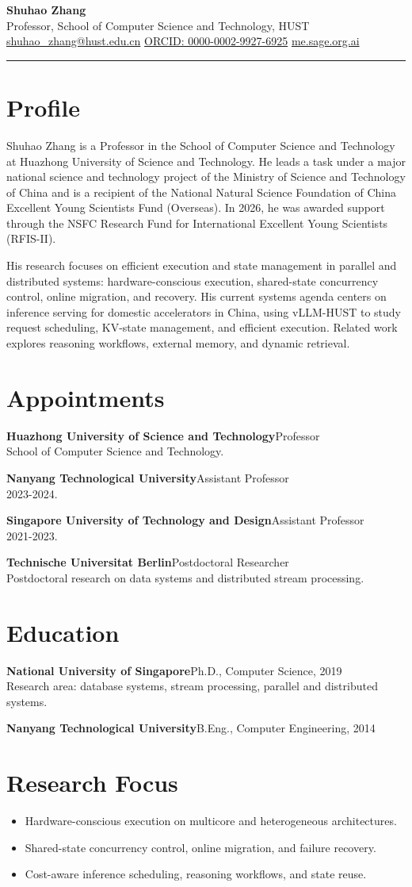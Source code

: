\documentclass[10pt,a4paper]{article}
\newcommand{\cvsection}[1]{\section*{#1}}
\newcommand{\entry}[2]{\textbf{#1}\hfill{\color{muted}#2}\\}
\begin{document}
{\Huge\bfseries Shuhao Zhang}\\[0.25em]
Professor, School of Computer Science and Technology, HUST\\
\href{mailto:shuhao_zhang@hust.edu.cn}{shuhao\_zhang@hust.edu.cn}
\quad
\href{https://orcid.org/0000-0002-9927-6925}{ORCID: 0000-0002-9927-6925}
\quad
\href{https://me.sage.org.ai}{me.sage.org.ai}

\vspace{0.45em}
{\color{accent}\rule{\linewidth}{0.9pt}}

\cvsection{Profile}
Shuhao Zhang is a Professor in the School of Computer Science and Technology at Huazhong University of Science and Technology. He leads a task under a major national science and technology project of the Ministry of Science and Technology of China and is a recipient of the National Natural Science Foundation of China Excellent Young Scientists Fund (Overseas). In 2026, he was awarded support through the NSFC Research Fund for International Excellent Young Scientists (RFIS-II).

His research focuses on efficient execution and state management in parallel and distributed systems: hardware-conscious execution, shared-state concurrency control, online migration, and recovery. His current systems agenda centers on inference serving for domestic accelerators in China, using vLLM-HUST to study request scheduling, KV-state management, and efficient execution. Related work explores reasoning workflows, external memory, and dynamic retrieval.

\cvsection{Appointments}
\entry{Huazhong University of Science and Technology}{Professor}
School of Computer Science and Technology.

\entry{Nanyang Technological University}{Assistant Professor}
2023-2024.

\entry{Singapore University of Technology and Design}{Assistant Professor}
2021-2023.

\entry{Technische Universitat Berlin}{Postdoctoral Researcher}
Postdoctoral research on data systems and distributed stream processing.

\cvsection{Education}
\entry{National University of Singapore}{Ph.D., Computer Science, 2019}
Research area: database systems, stream processing, parallel and distributed systems.

\entry{Nanyang Technological University}{B.Eng., Computer Engineering, 2014}

\cvsection{Research Focus}
\begin{itemize}
  \item Hardware-conscious execution on multicore and heterogeneous architectures.
  \item Shared-state concurrency control, online migration, and failure recovery.
  \item Cost-aware inference scheduling, reasoning workflows, and state reuse.
\end{itemize}
\end{document}
